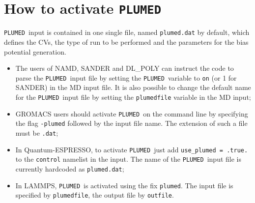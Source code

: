 \documentclass[12pt,fleqn]{report}
\newcommand{\plumed}{{\tt PLUMED}}
\begin{document}
\section{How to activate \plumed}

\plumed \ input is contained in one single file, named {\tt plumed.dat} by default, which defines the
CVs, the type of run to be performed and the parameters for the bias potential generation. 
\begin{itemize}
\item The users of NAMD, SANDER and DL\_POLY can instruct the code to parse the \plumed  \ input file by setting the
\plumed \ variable to {\tt on} (or 1 for SANDER) in the MD input file. It is also possible to change the default name
for the \plumed \ input file by setting the {\tt plumedfile} variable in the MD input;
\item GROMACS users should activate \plumed \ on the command line by specifying the flag {\tt -plumed}
followed by the input file name. The extension of such a file must be {\tt .dat};
\item In Quantum-ESPRESSO, to activate \plumed \  just add {\tt use\_plumed = .true.}
to the {\tt control} namelist in the input. The name of the \plumed \ input file is currently hardcoded as {\tt plumed.dat}; 
\item In LAMMPS, \plumed \ is activated using the fix {\tt plumed}. The input file is specified by  {\tt plumedfile},
the output file by {\tt outfile}. 
\end{itemize}
\end{document}
